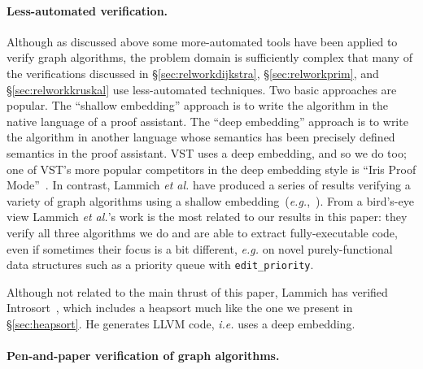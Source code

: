 \paragraph{Less-automated verification.}
Although as discussed above some more-automated tools have been applied to verify graph algorithms, the problem domain is sufficiently complex that many of the verifications discussed in \S\ref{sec:relworkdijkstra}, \S\ref{sec:relworkprim}, and \S\ref{sec:relworkkruskal} use less-automated techniques.  Two basic approaches are popular.  The ``shallow embedding'' approach is to write the algorithm in the native language of a proof assistant.  The ``deep embedding'' approach is to write the algorithm in another language whose semantics has been precisely defined semantics in the proof assistant.  VST uses a deep embedding, and so we do too; one of VST's more popular competitors in the deep embedding style is ``Iris Proof Mode''~\cite{DBLP:conf/popl/KrebbersTB17}.  In contrast, Lammich \emph{et al.} have produced a series of results verifying a variety of graph algorithms using a shallow embedding~(\emph{e.g.},~\cite{DBLP:conf/itp/Lammich14,DBLP:journals/afp/LammichN19,DBLP:journals/afp/HaslbeckLB19,DBLP:journals/jar/LammichS19,DBLP:conf/itp/LammichS16}).  From a bird's-eye view Lammich \emph{et al.}'s work is the most related to our results in this paper: they verify all three algorithms we do and are able to extract fully-executable code, even if sometimes their focus is a bit different, \emph{e.g.} on novel purely-functional data structures such as a  priority queue with \texttt{edit\_priority}.  %

Although not related to the main thrust of this paper, Lammich has verified Introsort~\cite{DBLP:conf/cade/Lammich20}, which includes a heapsort much like the one we present in \S\ref{sec:heapsort}.  He generates LLVM code, \emph{i.e.} uses a deep embedding.


\paragraph{Pen-and-paper verification of graph algorithms.}

